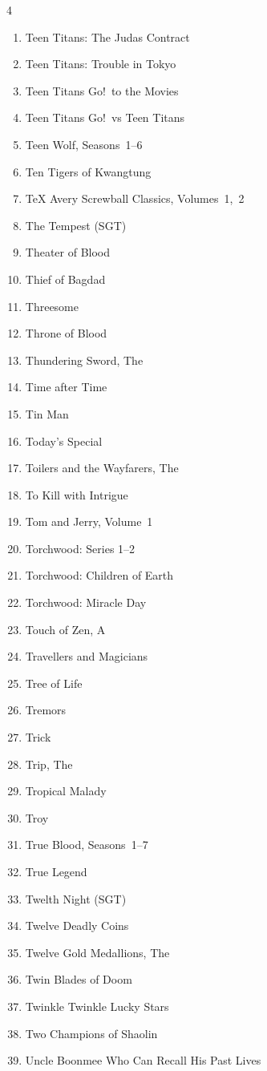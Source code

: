 \documentclass{article}
\begin{document}
\begin{multicols}{4}
\begin{enumerate}
\item Teen Titans: The Judas Contract
\item Teen Titans: Trouble in Tokyo
\item Teen Titans Go!\ to the Movies
\item Teen Titans Go!\ vs Teen Titans
\item Teen Wolf, Seasons~1--6
\item Ten Tigers of Kwangtung
\item TeX Avery Screwball Classics, Volumes~1,~2
\item The Tempest (SGT)
\item Theater of Blood
\item Thief of Bagdad
\item Threesome
\item Throne of Blood
\item Thundering Sword, The
\item Time after Time
\item Tin Man
\item Today's Special
\item Toilers and the Wayfarers, The
\item To Kill with Intrigue
\item Tom and Jerry, Volume~1
\item Torchwood: Series 1--2
\item Torchwood: Children of Earth
\item Torchwood: Miracle Day
\item Touch of Zen, A
\item Travellers and Magicians
\item Tree of Life
\item Tremors
\item Trick
\item Trip, The
\item Tropical Malady
\item Troy
\item True Blood, Seasons~1--7
\item True Legend
\item Twelth Night (SGT)
\item Twelve Deadly Coins
\item Twelve Gold Medallions, The
\item Twin Blades of Doom
\item Twinkle Twinkle Lucky Stars
\item Two Champions of Shaolin
\item Uncle Boonmee Who Can Recall His Past Lives

\end{enumerate}
\end{multicols}
\end{document}
